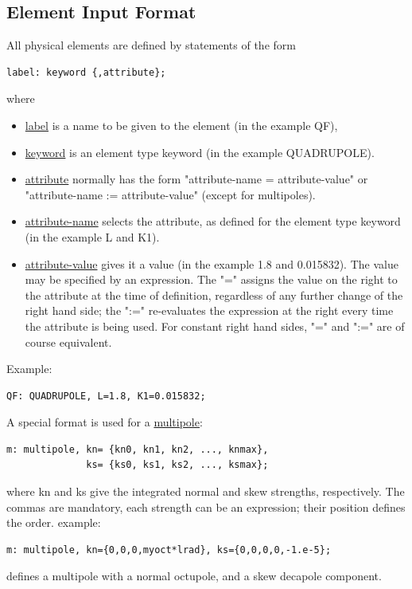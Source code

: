 \subsection{Element Input Format}
All physical elements are defined by statements of the form 
\begin{verbatim}
label: keyword {,attribute};
\end{verbatim} 
where 
\begin{itemize}
  \item \href{label.html}{label} is a name to be given to the element (in the example QF), 
  \item \href{keyword.html}{keyword} is an element type keyword (in the example QUADRUPOLE). 
  \item \href{attribute.html}{attribute} normally has the form
    "attribute-name = attribute-value" or
    "attribute-name := attribute-value" (except for multipoles).  
  \item \href{label.html}{attribute-name} selects the attribute,
    as defined for the element type keyword (in the example L and
    K1).  
  \item \href{attribute.html}{attribute-value} gives it a value
    (in the example 1.8 and 0.015832). The value may be specified
    by an expression. The "=" assigns the value on the right to
    the attribute at the time of definition, regardless of any
    further change of the right hand side; the ":=" re-evaluates
    the expression at the right every time the attribute is being
    used. For constant right hand sides, "=" and ":=" are of
    course equivalent.  
\end{itemize} 


Example: 
\begin{verbatim}
QF: QUADRUPOLE, L=1.8, K1=0.015832;
\end{verbatim} 

A special format is used for a \href{multipole.html}{multipole}: 
\begin{verbatim}
m: multipole, kn= {kn0, kn1, kn2, ..., knmax},
              ks= {ks0, ks1, ks2, ..., ksmax};
\end{verbatim} 
where kn and ks give the integrated normal and skew strengths,
respectively. The commas are mandatory, each strength can be an
expression; their position defines the order. example:  
\begin{verbatim}
m: multipole, kn={0,0,0,myoct*lrad}, ks={0,0,0,0,-1.e-5};
\end{verbatim} 
defines a multipole with a normal octupole, and a skew decapole component. 

